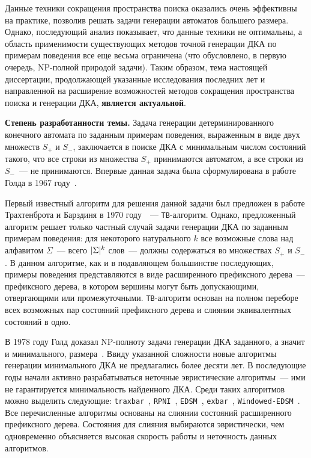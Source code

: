 Данные техники сокращения пространства поиска оказались очень эффективны на практике, позволив решать задачи генерации автоматов большего размера.
Однако, последующий анализ показывает, что данные техники не оптимальны, а область применимости существующих методов точной генерации ДКА по примерам поведения все еще весьма ограничена (что обусловлено, в первую очередь, NP-полной природой задачи).
Таким образом, тема настоящей диссертации, продолжающей указанные исследования последних лет и направленной на расширение возможностей методов сокращения пространства поиска и генерации ДКА, \textbf{является актуальной}.

\textbf{Степень разработанности темы.}
Задача генерации детерминированного конечного автомата по заданным примерам поведения, выраженным в виде двух множеств $S_{+}$ и $S_{-}$, заключается в поиске ДКА с минимальным числом состояний такого, что все строки из множества $S_{+}$ принимаются автоматом, а все строки из $S_{-}$~--- не принимаются.
Впервые данная задача была сформулирована в работе Голда в 1967 году~\cite{DBLP:journals/iandc/Gold67}.

Первый известный алгоритм для решения данной задачи был предложен в работе Трахтенброта и Барздиня в 1970 году~\cite{trakhtenbrot-1973-modeling}~--- \texttt{TB}-алгоритм.
Однако, предложенный алгоритм решает только частный случай задачи генерации ДКА по заданным примерам поведения: для некоторого натурального $k$ все возможные слова над алфавитом $\Sigma$~--- всего $\lvert\Sigma\rvert^{k}$ слов~--- должны содержаться во множествах $S_{+}$ и $S_{-}$.
В данном алгоритме, как и в подавляющем большинстве последующих, примеры поведения представляются в виде расширенного префиксного дерева~--- префиксного дерева, в котором вершины могут быть допускающими, отвергающими или промежуточными.
\texttt{TB}-алгоритм основан на полном переборе всех возможных пар состояний префиксного дерева и слиянии эквивалентных состояний в одно.

В 1978 году Голд доказал NP-полноту задачи генерации ДКА заданного, а значит и минимального, размера~\cite{DBLP:journals/iandc/Gold78}.
Ввиду указанной сложности новые алгоритмы генерации минимального ДКА не предлагались более десяти лет.
В последующие годы начали активно разрабатываться неточные эвристические алгоритмы~--- ими не гарантируется минимальность найденного ДКА.
Среди таких алгоритмов можно выделить следующие: \texttt{traxbar}~\cite{DBLP:conf/colt/Lang92}, \texttt{RPNI}~\cite{oncina-rpni-1992}, \texttt{EDSM}~\cite{DBLP:conf/icgi/LangPP98}, \texttt{exbar}~\cite{lang-1999-faster}, \texttt{Windowed-EDSM}~\cite{DBLP:conf/icgi/CicchelloK02}.
Все перечисленные алгоритмы основаны на слиянии состояний расширенного префиксного дерева.
Состояния для слияния выбираются эвристически, чем одновременно объясняется высокая скорость работы и неточность данных алгоритмов.

